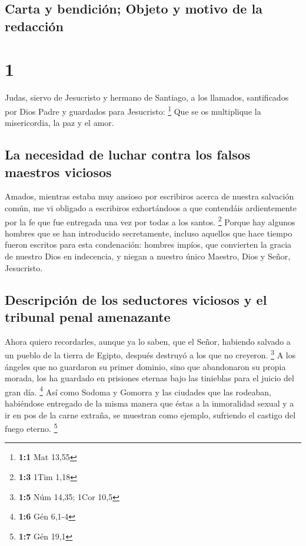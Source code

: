 \hypertarget{carta-y-bendiciuxf3n-objeto-y-motivo-de-la-redacciuxf3n}{%
\subsection{Carta y bendición; Objeto y motivo de la
redacción}\label{carta-y-bendiciuxf3n-objeto-y-motivo-de-la-redacciuxf3n}}

\hypertarget{section}{%
\section{1}\label{section}}

 Judas, siervo de Jesucristo y hermano de Santiago, a los
llamados, santificados por Dios Padre y guardados para Jesucristo:
\footnote{\textbf{1:1} Mat 13,55}  Que se os multiplique
la misericordia, la paz y el amor.

\hypertarget{la-necesidad-de-luchar-contra-los-falsos-maestros-viciosos}{%
\subsection{La necesidad de luchar contra los falsos maestros
viciosos}\label{la-necesidad-de-luchar-contra-los-falsos-maestros-viciosos}}

 Amados, mientras estaba muy ansioso por escribiros acerca
de nuestra salvación común, me vi obligado a escribiros exhortándoos a
que contendáis ardientemente por la fe que fue entregada una vez por
todas a los santos. \footnote{\textbf{1:3} 1Tim 1,18} 
Porque hay algunos hombres que se han introducido secretamente, incluso
aquellos que hace tiempo fueron escritos para esta condenación: hombres
impíos, que convierten la gracia de nuestro Dios en indecencia, y niegan
a nuestro único Maestro, Dios y Señor, Jesucristo.

\hypertarget{descripciuxf3n-de-los-seductores-viciosos-y-el-tribunal-penal-amenazante}{%
\subsection{Descripción de los seductores viciosos y el tribunal penal
amenazante}\label{descripciuxf3n-de-los-seductores-viciosos-y-el-tribunal-penal-amenazante}}

 Ahora quiero recordarles, aunque ya lo saben, que el
Señor, habiendo salvado a un pueblo de la tierra de Egipto, después
destruyó a los que no creyeron. \footnote{\textbf{1:5} Núm 14,35; 1Cor
  10,5}  A los ángeles que no guardaron su primer dominio,
sino que abandonaron su propia morada, los ha guardado en prisiones
eternas bajo las tinieblas para el juicio del gran día. \footnote{\textbf{1:6}
  Gén 6,1-4}  Así como Sodoma y Gomorra y las ciudades que
las rodeaban, habiéndose entregado de la misma manera que éstas a la
inmoralidad sexual y a ir en pos de la carne extraña, se muestran como
ejemplo, sufriendo el castigo del fuego eterno. \footnote{\textbf{1:7}
  Gén 19,1}

